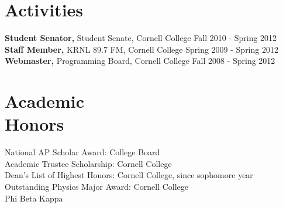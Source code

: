 \documentclass[margin]{res}
\begin{document}
\begin{resume}


\section{Activities}
{\bf Student Senator,} Student Senate, Cornell College \hfill Fall 2010 - Spring 2012 \\
{\bf Staff Member,} KRNL 89.7 FM, Cornell College \hfill Spring 2009 - Spring 2012 \\
{\bf Webmaster,} Programming Board, Cornell College \hfill Fall 2008 - Spring 2012


\section{Academic \\ Honors}
National AP Scholar Award: College Board \\
Academic Trustee Scholarship: Cornell College \\
Dean's List of Highest Honors: Cornell College, since sophomore year \\
Outstanding Physics Major Award: Cornell College \\
Phi Beta Kappa



\end{resume}
\end{document}
